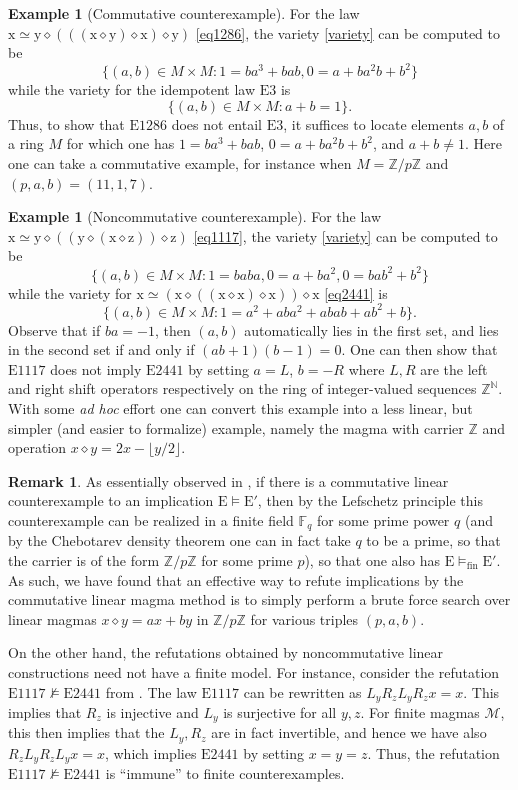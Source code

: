 \documentclass[12pt]{amsart}
\theoremstyle{definition}
\newtheorem{example}[theorem]{Example}
\newtheorem{remark}[theorem]{Remark}
\newcommand{\N}{\mathbb{N}}
\newcommand{\Z}{\mathbb{Z}}
\newcommand{\x}{\mathrm{x}}
\newcommand{\y}{\mathrm{y}}
\newcommand{\z}{\mathrm{z}}
\newcommand{\op}{\diamond}
\newcommand{\formaleq}{\simeq}
\newcommand{\nmodels}{\not\models}
\newcommand{\modelsfin}{\models_{\mathrm{fin}}}
\newcommand{\Magma}{{\mathcal{M}}}
\newcommand{\Eq}[1]{\mathrm{E}#1}
\newcommand{\E}{\mathrm{E}}
\begin{document}
\begin{example}[Commutative counterexample]\label{1286-ex} For the law $\x \formaleq \y \op (((\x \op \y) \op \x) \op \y)$ \eqref{eq1286}, the variety \eqref{variety} can be computed to be
$$ \{ (a,b) \in M \times M: 1 = ba^3+bab, 0 = a + ba^2 b + b^2 \}$$
while the variety for the idempotent law $\Eq{3}$ is
$$ \{ (a,b) \in M \times M: a+b=1 \}.$$
Thus, to show that $\Eq{1286}$ does not entail $\Eq{3}$, it suffices to locate elements $a,b$ of a ring $M$ for which one has $1 = ba^3+bab$, $0 = a + ba^2 b + b^2$, and $a+b \neq 1$.  Here one can take a commutative example, for instance when $M = \Z/p\Z$ and $(p,a,b) = (11,1,7)$.
\end{example}

\begin{example}[Noncommutative counterexample]\label{1117-ex} For the law $\x \formaleq \y \op ((\y \op (\x \op \z)) \op \z)$ \eqref{eq1117}, the variety \eqref{variety} can be computed to be
$$ \{ (a,b) \in M \times M: 1 = baba, 0 = a+ba^2, 0 = bab^2 + b^2 \}$$
while the variety for $\x \formaleq (\x \op ((\x \op \x) \op \x)) \op \x$ \eqref{eq2441} is
$$ \{ (a,b) \in M \times M: 1 = a^2 + aba^2 + abab + ab^2 + b \}.$$
Observe that if $ba = -1$, then $(a,b)$ automatically lies in the first set, and lies in the second set if and only if $(ab+1)(b-1) = 0$.  One can then show that $\Eq{1117}$ does not imply $\Eq{2441}$ by setting $a = L$, $b = -R$ where $L, R$ are the left and right shift operators respectively on the ring of integer-valued sequences $\Z^\N$.  With some \emph{ad hoc} effort one can convert this example into a less linear, but simpler (and easier to formalize) example, namely the magma with carrier $\Z$ and operation $x \op y = 2x - \lfloor y/2 \rfloor$.
\end{example}

\begin{remark} As essentially observed in \cite{austin}, if there is a commutative linear counterexample to an implication $\E \models {\E'}$, then by the Lefschetz principle this counterexample can be realized in a finite field ${\mathbb F}_q$ for some prime power $q$ (and by the Chebotarev density theorem one can in fact take $q$ to be a prime, so that the carrier is of the form $\Z/p\Z$ for some prime $p$), so that one also has $\E \modelsfin {\E'}$.  As such, we have found that an effective way to refute implications by the commutative linear magma method is to simply perform a brute force search over linear magmas $x \op y = ax + by$ in $\Z/p\Z$ for various triples $(p,a,b)$.

On the other hand, the refutations obtained by noncommutative linear constructions need not have a finite model.  For instance, consider the refutation $\Eq{1117} \nmodels \Eq{2441}$ from .  The law $\Eq{1117}$ can be rewritten as $L_y R_z L_y R_z x = x$.  This implies that $R_z$ is injective and $L_y$ is surjective for all $y,z$.  For finite magmas $\Magma$, this then implies that the $L_y, R_z$ are in fact invertible, and hence we have also $R_z L_y R_z L_y x = x$, which implies $\Eq{2441}$ by setting $x=y=z$.  Thus, the refutation $\Eq{1117} \nmodels \Eq{2441}$ is ``immune'' to finite counterexamples.
\end{remark}
\end{document}
